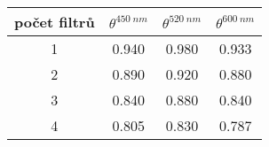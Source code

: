\begin{tabular}[t]{
  S[table-format=1.0]
  S[table-format=1.2]
  S[table-format=1.2]
  S[table-format=1.2]
}\toprule
{počet filtrů} & {$\theta^{\SI{450}{nm}}$}   & {$\theta^{\SI{520}{nm}}$}   & {$\theta^{\SI{600}{nm}}$}  \\              & 0.940                       & 0.980                       & 0.933                      \\
2              & 0.890                       & 0.920                       & 0.880                      \\
3              & 0.840                       & 0.880                       & 0.840                      \\
4              & 0.805                       & 0.830                       & 0.787                      \\\bottomrule
\end{tabular}
